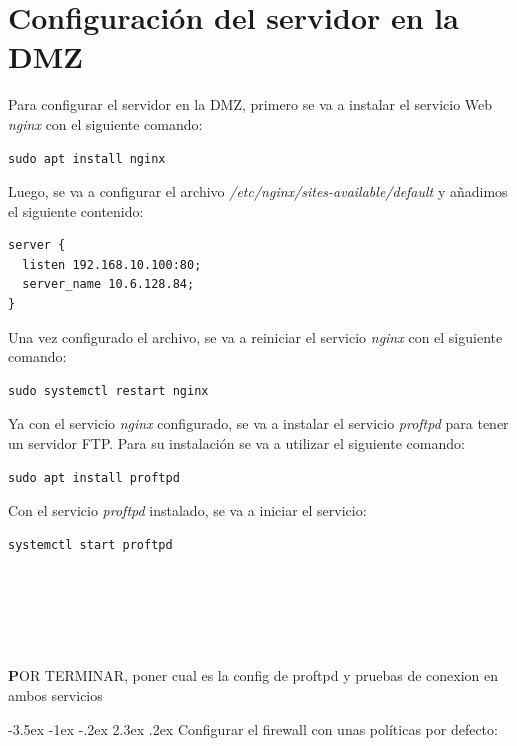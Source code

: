 \documentclass[11pt]{report}
\makeatletter
\renewcommand\chapter{\@startsection{chapter}{0}{\z@}%
    {-3.5ex \@plus -1ex \@minus -.2ex}%
    {2.3ex \@plus.2ex}%
    {\normalfont\Large\bfseries}}
\makeatother
\begin{document}
\section{Configuración del servidor en la DMZ}
Para configurar el servidor en la DMZ, primero se va a instalar el servicio Web
\emph{nginx} con el siguiente comando:
\begin{BVerbatim}
sudo apt install nginx
\end{BVerbatim}

Luego, se va a configurar el archivo \emph{/etc/nginx/sites-available/default} y añadimos
el siguiente contenido:
\begin{verbatim}
server {
  listen 192.168.10.100:80;
  server_name 10.6.128.84;
}
\end{verbatim}

Una vez configurado el archivo, se va a reiniciar el servicio \emph{nginx} con el siguiente comando: \\
\begin{BVerbatim}
sudo systemctl restart nginx
\end{BVerbatim}

Ya con el servicio \emph{nginx} configurado, se va a instalar el servicio \emph{proftpd} para tener un servidor FTP. Para su instalación
se va a utilizar el siguiente comando:
\begin{BVerbatim}
sudo apt install proftpd
\end{BVerbatim}

Con el servicio \emph{proftpd} instalado, se va a iniciar el servicio:
\begin{BVerbatim}
systemctl start proftpd
\end{BVerbatim}
\\ 
\\ 
\\ 
\\
\\
\textbf POR TERMINAR, poner cual es la config de proftpd y pruebas de conexion en ambos servicios

\cleardoublepage

\chapter{Configurar el firewall con unas políticas por defecto: }



\cleardoublepage
\end{document}
